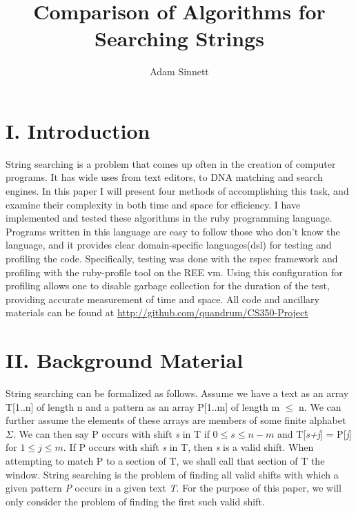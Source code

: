 \documentclass{chi2005}
\title{Comparison of Algorithms for Searching Strings}
\author{Adam Sinnett}
\begin{document}
\maketitle



\section{I. Introduction}

String searching is a problem that comes up often in the creation of computer programs. It has wide uses from text editors, to DNA matching and search engines. In this paper I will present four methods of accomplishing this task, and examine their complexity in both time and space for efficiency. I have implemented and tested these algorithms in the ruby programming language. Programs written in this language are easy to follow those who don't know the language, and it provides clear domain-specific languages(dsl) for testing and profiling the code. Specifically, testing was done with the rspec framework and profiling with the ruby-profile tool on the REE vm. Using this configuration for profiling allows one to disable garbage collection for the duration of the test, providing accurate measurement of time and space. All code and ancillary materials can be found at \url{http://github.com/quandrum/CS350-Project}

\section{II. Background Material}

String searching can be formalized as follows. Assume we have a text as an array T[1..n] of length n and a pattern as an array P[1..m] of length m $\le$ n. We can further assume the elements of these arrays are members of some finite alphabet $\Sigma$. We can then say P occurs with shift \emph{s}  in T if $0 \le s \le n - m$ and T[\emph{s+j}] = P[\emph{j}] for $1 \le j \le m$. If P occurs with shift \emph{s} in T, then \emph{s} is a valid shift. When attempting to match P to a section of T, we shall call that section of T the window. String searching is the problem of finding all valid shifts with which a given pattern \emph{P} occurs in a given text \emph{T}. For the purpose of this paper, we will only consider the problem of finding the first such valid shift. 
\end{document}
